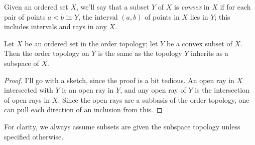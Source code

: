 \documentclass[10pt]{report}
\begin{document}
Given an ordered set $X$, we'll say that a subset $Y$ of $X$ is \emph{convex} in $X$ if for each pair of points $a<b$ in $Y$, the interval $(a,b)$ of points in $X$ lies in $Y$; this includes intervals and rays in any $X$.

\begin{theorem}
  Let $X$ be an ordered set in the order topology; let $Y$ be a convex subset of $X$.
  Then the order topology on $Y$ is the same as the topology $Y$ inherits as a subspace of $X$.
\end{theorem}
\begin{proof}
  I'll go with a sketch, since the proof is a bit tedious.
  An open ray in $X$ intersected with $Y$ is an open ray in $Y$, and any open ray of $Y$ is the intersection of open rays in $X$.
  Since the open rays are a subbasis of the order topology, one can pull each direction of an inclusion from this.
\end{proof}

For clarity, we always assume subsets are given the subspace topology unless specified otherwise.
\end{document}
